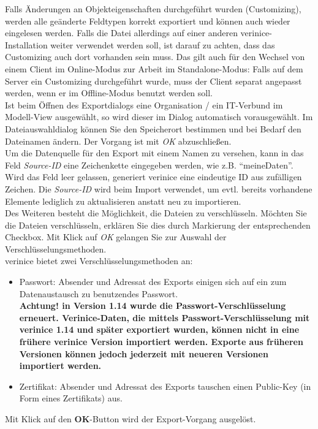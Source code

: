 \documentclass[a4paper,10pt]{book}
\begin{document}
Falls Änderungen an Objekteigenschaften durchgeführt wurden (Customizing), werden alle geänderte Feldtypen korrekt exportiert und können
auch wieder eingelesen werden. Falls die Datei allerdings auf einer anderen verinice-Installation weiter verwendet werden soll, ist darauf
zu achten, dass das Customizing auch dort vorhanden sein muss. Das gilt auch für den Wechsel von einem Client im Online-Modus zur Arbeit
im Standalone-Modus: Falls auf dem Server ein Customizing durchgeführt wurde, muss der Client separat angepasst werden, wenn er im Offline-Modus
benutzt werden soll.
\newline\\
Ist beim Öffnen des Exportdialogs eine Organisation / ein IT-Verbund im Modell-View ausgewählt, so wird dieser im Dialog automatisch vorausgewählt.
Im Dateiauswahldialog können Sie den Speicherort bestimmen und bei Bedarf den Dateinamen ändern. Der Vorgang ist mit  \textit{OK} abzuschließen.
\newline\\
Um die Datenquelle für den Export mit einem Namen zu versehen, kann in das Feld \textit{Source-ID} eine Zeichenkette eingegeben werden, wie z.B.
``meineDaten''. Wird das Feld leer gelassen, generiert verinice eine eindeutige ID aus zufälligen Zeichen. Die \textit{Source-ID} wird beim Import verwendet,
um evtl. bereits vorhandene Elemente lediglich zu aktualisieren anstatt neu zu importieren.
\newline\\
Des Weiteren besteht die Möglichkeit, die Dateien zu verschlüsseln. Möchten Sie die Dateien verschlüsseln, erklären Sie dies durch Markierung der
entsprechenden Checkbox. Mit Klick auf \textit{OK} gelangen Sie zur Auswahl der Verschlüsselungsmethoden.
\newline\\
verinice bietet zwei Verschlüsselungsmethoden an:
\begin{itemize}
\item Passwort: Absender und Adressat des Exports einigen sich auf ein
  zum
  Datenaustausch zu benutzendes Passwort.\\
  \textbf{Achtung! in Version 1.14 wurde die Passwort-Verschlüsselung
    erneuert.  Verinice-Daten, die mittels Passwort-Verschlüsselung
    mit verinice 1.14 und später exportiert wurden, können nicht in
    eine frühere verinice Version importiert werden. Exporte aus
    früheren Versionen können jedoch jederzeit mit neueren Versionen
    importiert werden.}
 \item Zertifikat: Absender und Adressat des Exports tauschen einen Public-Key (in Form eines Zertifikats) aus.
\end{itemize}
Mit Klick auf den \textbf{OK}-Button wird der Export-Vorgang ausgelöst.
\end{document}
